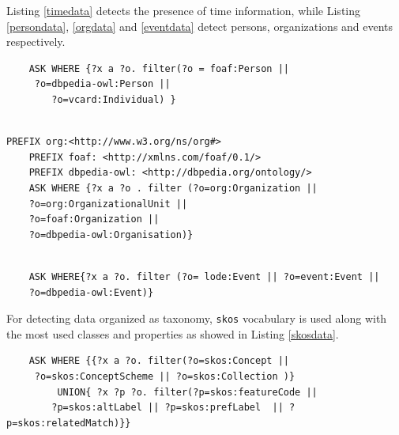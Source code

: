 Listing \ref{timedata} detects the presence of time information, while Listing \ref{persondata}, \ref{orgdata} and \ref{eventdata} detect persons, organizations and events respectively.

\begin{lstlisting}
	ASK WHERE {?x a ?o. filter(?o = foaf:Person ||
	 ?o=dbpedia-owl:Person ||
		?o=vcard:Individual) }
	
\end{lstlisting}

\begin{lstlisting}
PREFIX org:<http://www.w3.org/ns/org#>
	PREFIX foaf: <http://xmlns.com/foaf/0.1/>
	PREFIX dbpedia-owl: <http://dbpedia.org/ontology/>
	ASK WHERE {?x a ?o . filter (?o=org:Organization ||
	?o=org:OrganizationalUnit ||
	?o=foaf:Organization ||
	?o=dbpedia-owl:Organisation)}
	
\end{lstlisting}	

\begin{lstlisting}
    ASK WHERE{?x a ?o. filter (?o= lode:Event || ?o=event:Event ||
    ?o=dbpedia-owl:Event)}	

  \end{lstlisting}


For detecting data organized as taxonomy, \texttt{skos} vocabulary is used along with the most used classes and properties as showed in Listing \ref{skosdata}.

\begin{lstlisting}
    ASK WHERE {{?x a ?o. filter(?o=skos:Concept ||
     ?o=skos:ConceptScheme || ?o=skos:Collection )}
    	 UNION{ ?x ?p ?o. filter(?p=skos:featureCode ||
    	?p=skos:altLabel || ?p=skos:prefLabel  || ?p=skos:relatedMatch)}}		
\end{lstlisting}


